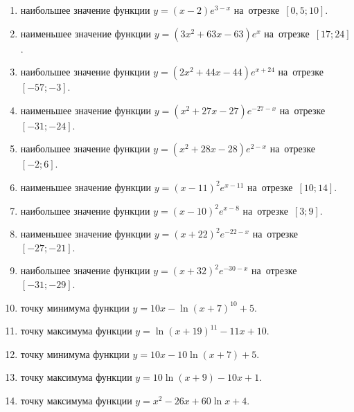 \documentclass[a4paper,10pt]{article}
\begin{document}
\begin{enumerate}
\item {} наибольшее значение функции $y=\left(x-2\right)e^{3-x}$ на~отрезке~$\left[0,5;10\right]$.

\item {} наименьшее значение функции $y=\left(3x^2 +63x -63\right)e^{x }$ на~отрезке~$\left[17;24\right]$.

\item {} наибольшее значение функции $y=\left(2x^2 +44x -44\right)e^{x+24}$ на~отрезке~$\left[-57;-3\right]$.

\item {} наименьшее значение функции $y=\left(x^2 +27x -27\right)e^{-27-x}$ на~отрезке~$\left[-31;-24\right]$.

\item {} наибольшее значение функции $y=\left(x^2 +28x -28\right)e^{2-x}$ на~отрезке~$\left[-2;6\right]$.

\item {} наименьшее значение функции $y=\left(x-11\right)^2e^{x-11}$ на~отрезке~$\left[10;14\right]$.

\item {} наибольшее значение функции $y=\left(x-10\right)^2e^{x-8}$ на~отрезке~$\left[3;9\right]$.

\item {} наименьшее значение функции $y=\left(x+22\right)^2e^{-22-x}$ на~отрезке~$\left[-27;-21\right]$.

\item {} наибольшее значение функции $y=\left(x+32\right)^2e^{-30-x}$ на~отрезке~$\left[-31;-29\right]$.

\item {} точку минимума функции $y=10x-\ln\left(x+7\right)^{10}+5$.

\item {} точку максимума функции $y=\ln\left(x+19\right)^{11}-11x+10$.

\item {} точку минимума функции $y=10x-10\ln\left(x+7\right)+5$.

\item {} точку максимума функции $y=10\ln\left(x+9\right)-10x+1$.

\item {} точку максимума функции $y=x^2-26x+60\ln x +4$.


\end{enumerate}
\end{document}
